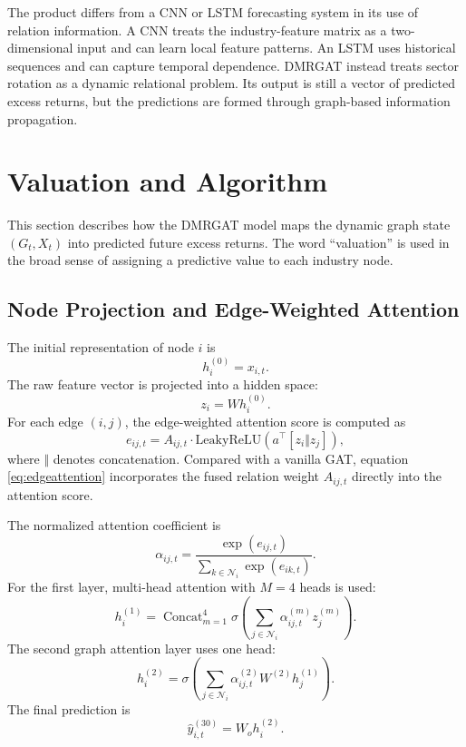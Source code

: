 \documentclass[12pt]{article}
\begin{document}
The product differs from a CNN or LSTM forecasting system in its use of relation information. A CNN treats the industry-feature matrix as a two-dimensional input and can learn local feature patterns. An LSTM uses historical sequences and can capture temporal dependence. DMRGAT instead treats sector rotation as a dynamic relational problem. Its output is still a vector of predicted excess returns, but the predictions are formed through graph-based information propagation.

\section{Valuation and Algorithm}
\label{sec:algorithm}

This section describes how the DMRGAT model maps the dynamic graph state $(G_t,X_t)$ into predicted future excess returns. The word ``valuation'' is used in the broad sense of assigning a predictive value to each industry node.

\subsection{Node Projection and Edge-Weighted Attention}

The initial representation of node $i$ is
\begin{equation}
h_i^{(0)}=x_{i,t}.
\end{equation}
The raw feature vector is projected into a hidden space:
\begin{equation}
z_i=Wh_i^{(0)}.
\end{equation}
For each edge $(i,j)$, the edge-weighted attention score is computed as
\begin{equation}
e_{ij,t}=A_{ij,t}\cdot
\mathrm{LeakyReLU}\left(a^\top[z_i\Vert z_j]\right),
\label{eq:edgeattention}
\end{equation}
where $\Vert$ denotes concatenation. Compared with a vanilla GAT, equation \eqref{eq:edgeattention} incorporates the fused relation weight $A_{ij,t}$ directly into the attention score.

The normalized attention coefficient is
\begin{equation}
\alpha_{ij,t}=\frac{\exp(e_{ij,t})}
{\sum_{k\in \mathcal{N}_i}\exp(e_{ik,t})}.
\end{equation}
For the first layer, multi-head attention with $M=4$ heads is used:
\begin{equation}
h_i^{(1)}=
\mathop{\mathrm{Concat}}_{m=1}^{4}
\sigma\left(\sum_{j\in\mathcal{N}_i}\alpha_{ij,t}^{(m)}z_j^{(m)}\right).
\end{equation}
The second graph attention layer uses one head:
\begin{equation}
h_i^{(2)}=
\sigma\left(\sum_{j\in\mathcal{N}_i}\alpha_{ij,t}^{(2)}W^{(2)}h_j^{(1)}\right).
\end{equation}
The final prediction is
\begin{equation}
\widehat{y}_{i,t}^{(30)}=W_oh_i^{(2)}.
\end{equation}
\end{document}
